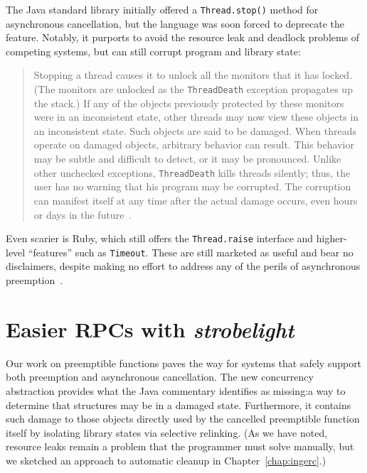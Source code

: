 The Java standard library initially offered a \texttt{Thread.stop()} method for
asynchronous cancellation, but the language was soon forced to deprecate the feature.
Notably, it purports to avoid the resource leak and deadlock problems of competing
systems, but can still corrupt program and library state:
\begin{quote}
Stopping a thread causes it to unlock all the monitors that it has locked.  (The
monitors are unlocked as the \texttt{ThreadDeath} exception propagates up the stack.)
If any of the objects previously protected by these monitors were in an inconsistent
state, other threads may now view these objects in an inconsistent state.  Such
objects are said to be damaged. When threads operate on damaged objects, arbitrary
behavior can result.  This behavior may be subtle and difficult to detect, or it may
be pronounced.  Unlike other unchecked exceptions, \texttt{ThreadDeath} kills threads
silently; thus, the user has no warning that his program may be corrupted.  The
corruption can manifest itself at any time after the actual damage occurs, even hours
or days in the future~\cite{www-java-stop}.
\end{quote}

Even scarier is Ruby, which still offers the \texttt{Thread.raise} interface and
higher-level ``features'' such as \texttt{Timeout}.  These are still marketed as
useful and bear no disclaimers, despite making no effort to address any of the perils
of asynchronous preemption~\cite{www-ruby-danger-terrifying}.


\section{Easier RPCs with \textit{strobelight}}

Our work on preemptible functions paves the way for systems that safely support both
preemption and asynchronous cancellation.  The new concurrency abstraction provides
what the Java commentary identifies as missing:\@ a way to determine that structures
may be in a damaged state.  Furthermore, it contains such damage to those objects
directly used by the cancelled preemptible function itself by isolating library
states via selective relinking.  (As we have noted, resource leaks remain a problem
that the programmer must solve manually, but we sketched an approach to automatic
cleanup in Chapter~\ref{chap:ingerc}.)

